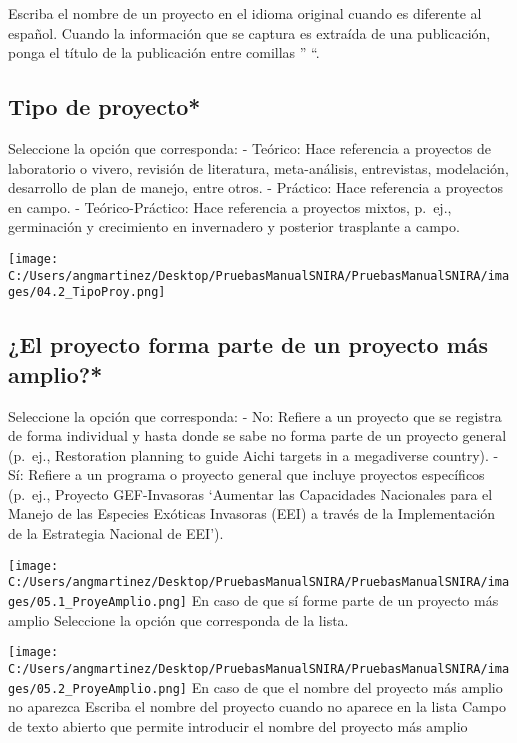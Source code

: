 \documentclass[
]{book}
\begin{document}
Escriba el nombre de un proyecto en el idioma original cuando es diferente al español.
Cuando la información que se captura es extraída de una publicación, ponga el título de la publicación entre comillas '' ``.

\hypertarget{tipo-de-proyecto}{%
\subsection{Tipo de proyecto*}\label{tipo-de-proyecto}}

Seleccione la opción que corresponda: - Teórico: Hace referencia a proyectos de laboratorio o vivero, revisión de literatura, meta-análisis, entrevistas, modelación, desarrollo de plan de manejo, entre otros.
- Práctico: Hace referencia a proyectos en campo.
- Teórico-Práctico: Hace referencia a proyectos mixtos, p.~ej., germinación y crecimiento en invernadero y posterior trasplante a campo.

\texttt{[image: C:/Users/angmartinez/Desktop/PruebasManualSNIRA/PruebasManualSNIRA/images/04.2\_TipoProy.png]}

\hypertarget{el-proyecto-forma-parte-de-un-proyecto-muxe1s-amplio}{%
\subsection{¿El proyecto forma parte de un proyecto más amplio?*}\label{el-proyecto-forma-parte-de-un-proyecto-muxe1s-amplio}}

Seleccione la opción que corresponda: - No: Refiere a un proyecto que se registra de forma individual y hasta donde se sabe no forma parte de un proyecto general (p.~ej., Restoration planning to guide Aichi targets in a megadiverse country).
- Sí: Refiere a un programa o proyecto general que incluye proyectos específicos (p.~ej., Proyecto GEF-Invasoras `Aumentar las Capacidades Nacionales para el Manejo de las Especies Exóticas Invasoras (EEI) a través de la Implementación de la Estrategia Nacional de EEI').

\texttt{[image: C:/Users/angmartinez/Desktop/PruebasManualSNIRA/PruebasManualSNIRA/images/05.1\_ProyeAmplio.png]} En caso de que sí forme parte de un proyecto más amplio Seleccione la opción que corresponda de la lista.

\texttt{[image: C:/Users/angmartinez/Desktop/PruebasManualSNIRA/PruebasManualSNIRA/images/05.2\_ProyeAmplio.png]} En caso de que el nombre del proyecto más amplio no aparezca Escriba el nombre del proyecto cuando no aparece en la lista Campo de texto abierto que permite introducir el nombre del proyecto más amplio
\end{document}

